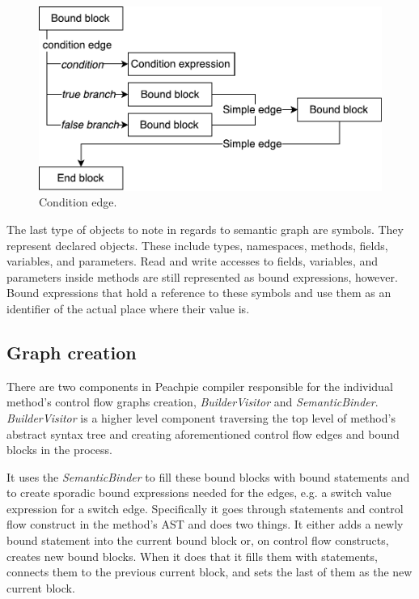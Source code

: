 \begin{figure}[h]
	\centering	
	\includegraphics[scale=0.75]{../img/3_3_blocksedges}	
	\caption{Condition edge.}
	\label{fig3.3:Edges}
\end{figure}

The last type of objects to note in regards to semantic graph are symbols. They represent declared objects. These include types, namespaces, methods, fields, variables, and parameters. Read and write accesses to fields, variables, and parameters inside methods are still represented as bound expressions, however. Bound expressions that hold a reference to these symbols and use them as an identifier of the actual place where their value is.

\subsection{Graph creation}

There are two components in Peachpie compiler responsible for the individual method’s control flow graphs creation, \emph{BuilderVisitor} and \emph{SemanticBinder}. \emph{BuilderVisitor} is a higher level component traversing the top level of method’s abstract syntax tree and creating aforementioned control flow edges and bound blocks in the process. 

It uses the \emph{SemanticBinder} to fill these bound blocks with bound statements and to create sporadic bound expressions needed for the edges, e.g. a switch value expression for a switch edge. Specifically it goes through statements and control flow construct in the method’s AST and does two things. It either adds a newly bound statement into the current bound block or, on control flow constructs, creates new bound blocks. When it does that it fills them with statements, connects them to the previous current block, and sets the last of them as the new current block.

